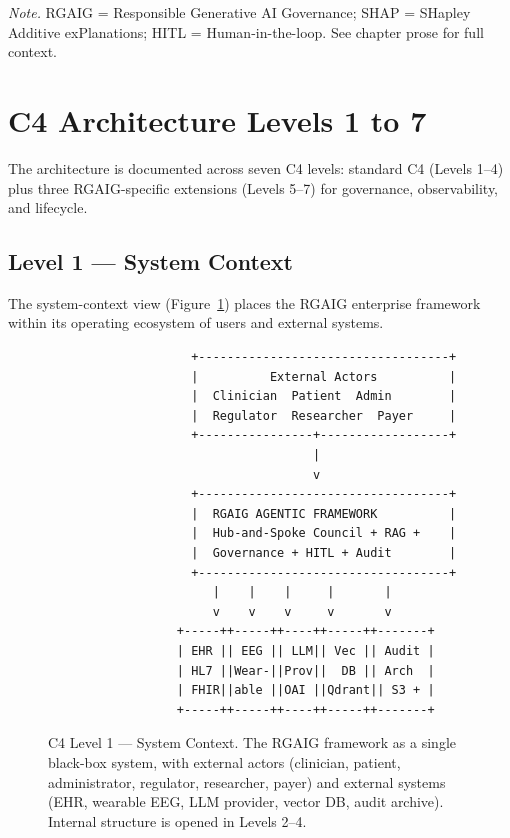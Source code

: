 \vspace{0.3em}\noindent\textit{Note.} RGAIG = Responsible Generative AI Governance; SHAP = SHapley Additive exPlanations; HITL = Human-in-the-loop. See chapter prose for full context.

\section{C4 Architecture Levels 1 to 7}
\label{sec:appo_c4}

The architecture is documented across seven C4 levels: standard C4 (Levels 1--4) plus three RGAIG-specific extensions (Levels 5--7) for governance, observability, and lifecycle.

\subsection{Level 1 --- System Context}

The system-context view (Figure~\ref{fig:appo_c4l1}) places the RGAIG enterprise framework within its operating ecosystem of users and external systems.

\begin{figure}[!htbp]
\centering
\begin{minipage}{0.95\textwidth}
\footnotesize\ttfamily
\begin{verbatim}
                    +-----------------------------------+
                    |          External Actors          |
                    |  Clinician  Patient  Admin        |
                    |  Regulator  Researcher  Payer     |
                    +----------------+------------------+
                                     |
                                     v
                    +-----------------------------------+
                    |  RGAIG AGENTIC FRAMEWORK          |
                    |  Hub-and-Spoke Council + RAG +    |
                    |  Governance + HITL + Audit        |
                    +-----------------------------------+
                       |    |    |     |       |
                       v    v    v     v       v
                  +-----++-----++----++-----++-------+
                  | EHR || EEG || LLM|| Vec || Audit |
                  | HL7 ||Wear-||Prov||  DB || Arch  |
                  | FHIR||able ||OAI ||Qdrant|| S3 + |
                  +-----++-----++----++-----++-------+
\end{verbatim}
\end{minipage}
\caption[C4 Level 1 --- System Context]{C4 Level 1 --- System Context. The RGAIG framework as a single black-box system, with external actors (clinician, patient, administrator, regulator, researcher, payer) and external systems (EHR, wearable EEG, LLM provider, vector DB, audit archive). Internal structure is opened in Levels 2--4.}
\label{fig:appo_c4l1}
\end{figure}


